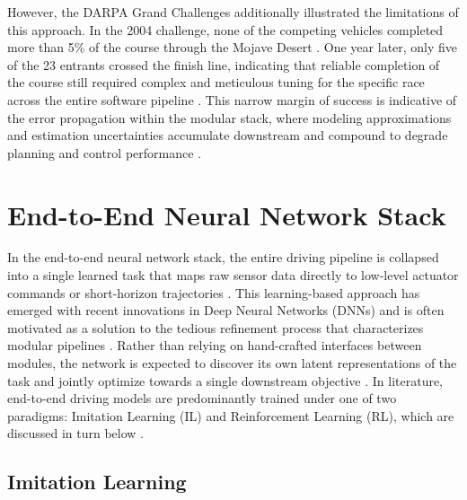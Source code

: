 However, the DARPA Grand Challenges additionally illustrated the limitations of this approach.
In the 2004 challenge, none of the competing vehicles completed more than 5\% of the course through the Mojave Desert \cite{ogretmen_local_2025, thrun_stanley_2006, montemerlo_winning_2006}.
One year later, only five of the 23 entrants crossed the finish line, indicating that reliable completion of the course still required complex and meticulous tuning for the specific race across the entire software pipeline \cite{tampuu_SurveyEndtoEndDriving_2022,wang_VersatileEfficientReinforcement_2022,jain_Autonomy_20_2021,kocic_end-to-end_2019,thrun_stanley_2006}.
This narrow margin of success is indicative of the error propagation within the modular stack, where modeling approximations and estimation uncertainties accumulate downstream and compound to degrade planning and control performance \cite{jain_Autonomy_20_2021,tampuu_SurveyEndtoEndDriving_2022,wang_VersatileEfficientReinforcement_2022,kocic_end-to-end_2019}.

\section{End-to-End Neural Network Stack}
\label{section:NNStack}

In the end-to-end neural network stack, the entire driving pipeline is collapsed into a single learned task that maps raw sensor data directly to low-level actuator commands or short-horizon trajectories \cite{hu_review_2026, tampuu_SurveyEndtoEndDriving_2022, hu_learning_2021, wang_VersatileEfficientReinforcement_2022, chib_recent_2023}.
This learning-based approach has emerged with recent innovations in Deep Neural Networks (DNNs) and is often motivated as a solution to the tedious refinement process that characterizes modular pipelines \cite{tampuu_SurveyEndtoEndDriving_2022, kocic_end-to-end_2019, hu_learning_2021}.
Rather than relying on hand-crafted interfaces between modules, the network is expected to discover its own latent representations of the task and jointly optimize towards a single downstream objective \cite{tampuu_SurveyEndtoEndDriving_2022, hu_learning_2021, chib_recent_2023}.
In literature, end-to-end driving models are predominantly trained under one of two paradigms: Imitation Learning (IL) and Reinforcement Learning (RL), which are discussed in turn below \cite{hu_review_2026, tampuu_SurveyEndtoEndDriving_2022, wang_VersatileEfficientReinforcement_2022, chib_recent_2023}.

\subsection{Imitation Learning}
\label{subsection:ImitationLearning}

